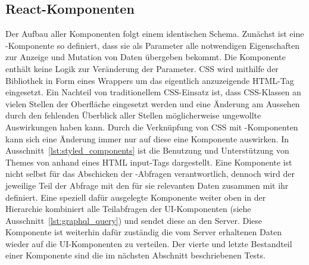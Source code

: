 \subsection{React-Komponenten}
Der Aufbau aller Komponenten folgt einem identischen Schema. Zunächst ist eine -Komponente so definiert, dass sie als Parameter alle notwendigen Eigenschaften zur Anzeige und Mutation von Daten übergeben bekommt. Die Komponente enthält keine Logik zur Veränderung der Parameter.
CSS wird mithilfe der Bibliothek  in Form eines Wrappers um das eigentlich anzuzeigende HTML-Tag eingesetzt. Ein Nachteil von traditionellem CSS-Einsatz ist, dass CSS-Klassen an vielen Stellen der Oberfläche eingesetzt werden und eine Änderung am Aussehen durch den fehlenden Überblick aller Stellen möglicherweise ungewollte Auswirkungen haben kann. Durch die Verknüpfung von CSS mit -Komponenten kann sich eine Änderung immer nur auf diese eine Komponente auswirken. In Ausschnitt~\ref{lst:styled_components} ist die Benutzung und Unterstützung von Themes von  anhand eines HTML input-Tags dargestellt.
Eine Komponente ist nicht selbst für das Abschicken der -Abfragen verantwortlich, dennoch wird der jeweilige Teil der Abfrage mit den für sie relevanten Daten zusammen mit ihr definiert. Eine speziell dafür ausgelegte Komponente weiter oben in der Hierarchie kombiniert alle Teilabfragen der UI-Komponenten (siehe Ausschnitt~\ref{lst:graphql_query}) und sendet diese an den Server. Diese Komponente ist weiterhin dafür zuständig die vom Server erhaltenen Daten wieder auf die UI-Komponenten zu verteilen.
Der vierte und letzte Bestandteil einer Komponente sind die im nächsten Abschnitt beschriebenen Tests.





